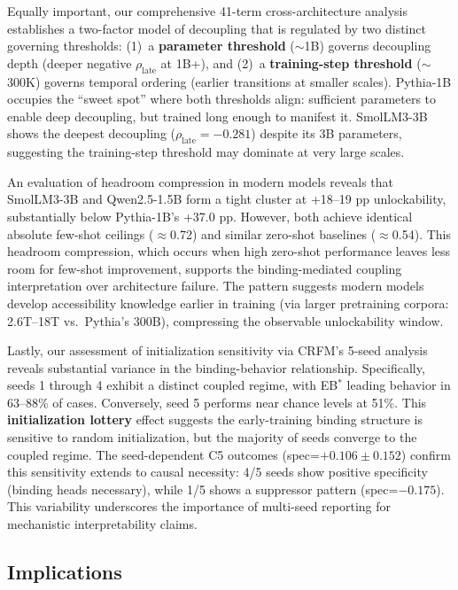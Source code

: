 \documentclass[10pt]{article} %
\begin{document}
Equally important, our comprehensive 41-term cross-architecture analysis establishes a two-factor model of decoupling that is regulated by two distinct governing thresholds:
(1)~a \textbf{parameter threshold} ($\sim$1B) governs decoupling depth (deeper negative $\rho_\text{late}$ at 1B+), and
(2)~a \textbf{training-step threshold} ($\sim$300K) governs temporal ordering (earlier transitions at smaller scales).
Pythia-1B occupies the ``sweet spot'' where both thresholds align: sufficient parameters to enable deep decoupling, but trained long enough to manifest it.
SmolLM3-3B shows the deepest decoupling ($\rho_\text{late}=-0.281$) despite its 3B parameters, suggesting the training-step threshold may dominate at very large scales.

An evaluation of headroom compression in modern models reveals that SmolLM3-3B and Qwen2.5-1.5B form a tight cluster at +18--19 pp unlockability, substantially below Pythia-1B's +37.0 pp.
However, both achieve identical absolute few-shot ceilings ($\approx$0.72) and similar zero-shot baselines ($\approx$0.54).
This headroom compression, which occurs when high zero-shot performance leaves less room for few-shot improvement, supports the binding-mediated coupling interpretation over architecture failure.
The pattern suggests modern models develop accessibility knowledge earlier in training (via larger pretraining corpora: 2.6T--18T vs.~Pythia's 300B), compressing the observable unlockability window.

Lastly, our assessment of initialization sensitivity via CRFM's 5-seed analysis reveals substantial variance in the binding-behavior relationship. Specifically, seeds 1 through 4 exhibit a distinct coupled regime, with EB$^*$ leading behavior in 63--88\% of cases. Conversely, seed 5 performs near chance levels at 51\%.
This \textbf{initialization lottery} effect suggests the early-training binding structure is sensitive to random initialization, but the majority of seeds converge to the coupled regime.
The seed-dependent C5 outcomes (spec=$+0.106\pm0.152$) confirm this sensitivity extends to causal necessity: 4/5 seeds show positive specificity (binding heads necessary), while 1/5 shows a suppressor pattern (spec=$-0.175$).
This variability underscores the importance of multi-seed reporting for mechanistic interpretability claims.

\subsection{Implications}
\end{document}
